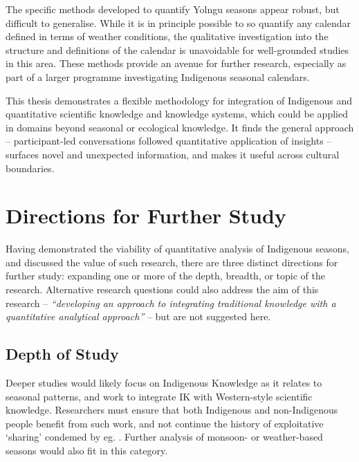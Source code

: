 The specific methods developed to quantify Yolngu seasons appear robust, but
difficult to generalise.  While it is in principle possible to so quantify
any calendar defined in terms of weather conditions, the qualitative
investigation into the structure and definitions of the calendar is unavoidable
for well-grounded studies in this area.  These methods provide an
avenue for further research, especially as part of a larger programme
investigating Indigenous seasonal calendars.

This thesis demonstrates a flexible methodology for integration
of Indigenous and quantitative scientific knowledge and knowledge systems,
which could be applied in domains beyond seasonal or ecological knowledge.
It finds the general approach -- participant-led conversations followed quantitative
application of insights -- surfaces novel and unexpected information, and
makes it useful across cultural boundaries.



\section{Directions for Further Study}
\label{sec:further-study}

Having demonstrated the viability of quantitative analysis of Indigenous
seasons, and discussed the value of such research, there are three distinct
directions for further study:  expanding one or more of the depth, breadth,
or topic of the research.  Alternative research questions could also address the aim
of this research -- \textit{``developing an approach to integrating traditional
knowledge with a quantitative analytical approach''} -- but are not suggested
here.

\subsection{Depth of Study}
Deeper studies would likely focus on Indigenous Knowledge as it
relates to seasonal patterns, and work to integrate IK with Western-style scientific
knowledge.  Researchers must ensure that both Indigenous and non-Indigenous
people benefit from such work, and not continue the history of exploitative
`sharing' condemed by eg. \citet{smith1999}.  Further analysis of monsoon-
or weather-based seasons would also fit in this category.

